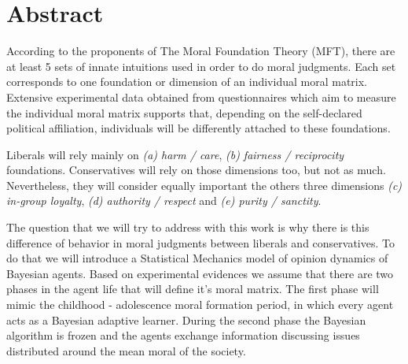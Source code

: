 \chapter*{Abstract}

According to the proponents of The Moral Foundation Theory (MFT), there are
at least 5 sets of innate intuitions used in order to do moral judgments. Each
set corresponds to one foundation or dimension of an individual moral matrix.
Extensive experimental data obtained from questionnaires which aim to measure
the individual moral matrix supports that, depending on the self-declared
political affiliation, individuals will be differently attached to these
foundations.

Liberals will rely mainly on \textit{(a) harm / care}, \textit{(b) fairness /
reciprocity} foundations. Conservatives will rely on those dimensions too, but
not as much. Nevertheless, they will consider equally important the others
three dimensions \textit{(c) in-group loyalty}, \textit{(d) authority /
respect} and \textit{(e) purity / sanctity}.

The question that we will try to address with this work is why there is this
difference of behavior in moral judgments between liberals and conservatives.
To do that we will introduce a Statistical Mechanics model of opinion
dynamics of Bayesian agents. Based on experimental evidences we assume that
there are two phases in the agent life that will define it's moral matrix.
The first phase will mimic the childhood - adolescence moral formation period,
in which every agent acts as a Bayesian adaptive learner.  During the second
phase the Bayesian algorithm is frozen and the agents exchange information
discussing issues distributed around the mean moral of the society.



